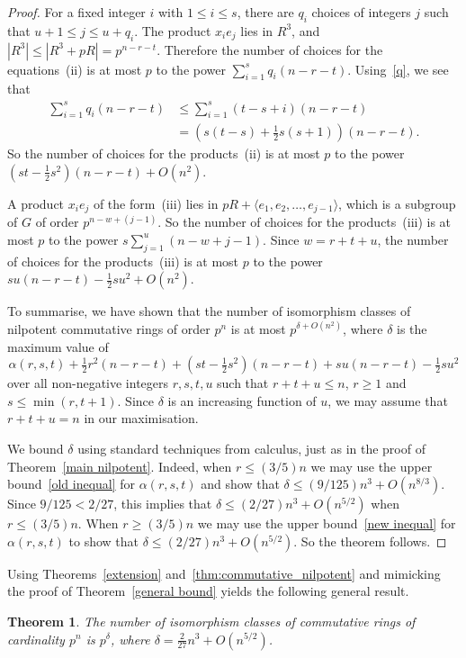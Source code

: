 \documentclass[12pt]{article}
\newtheorem{Thm}{Theorem}[section]
\begin{document}
\begin{proof}
For a fixed integer $i$ with $1\leq i\leq s$, there are $q_i$ choices of integers $j$ such that $u+1\leq j\leq u+q_i$. The product $x_ie_j$ lies in $R^3$, and $|R^3|\leq |R^3+pR|=p^{n-r-t}$. Therefore the number of choices for the equations~(ii) is at most $p$ to the power $\sum_{i=1}^sq_i(n-r-t)$. Using~\eqref{q}, we see that
\begin{align*}
\sum_{i=1}^sq_i(n-r-t)&\leq \sum_{i=1}^s(t-s+i)(n-r-t)\\
&=\left(s(t-s)+\tfrac{1}{2}s(s+1)\right)(n-r-t).
\end{align*}
So the number of choices for the products~(ii) is at most $p$ to the power $(st-\tfrac{1}{2}s^2)(n-r-t)+O(n^2)$.

A product $x_ie_j$ of the form~(iii) lies in $pR+\langle{e_1,e_2,\ldots,e_{j-1}}\rangle$, which is a subgroup of $G$ of order $p^{n-w+(j-1)}$. So the number of choices for the products~(iii) is at most $p$ to the power $s\sum_{j=1}^u(n-w+j-1)$. Since $w=r+t+u$, the number of choices for the products~(iii) is at most $p$ to the power $su(n-r-t)-\frac{1}{2}su^2+O(n^2)$.

To summarise, we have shown that the number of isomorphism classes of nilpotent commutative rings of order $p^n$ is at most $p^{\delta+O(n^2)}$, where $\delta$ is the maximum value of
\[
\alpha(r,s,t)+\tfrac{1}{2}r^2(n-r-t)+(st-\tfrac{1}{2}s^2)(n-r-t)+su(n-r-t)-\tfrac{1}{2}su^2
\]
over all non-negative integers $r,s,t,u$ such that $r+t+u\leq n$, $r\geq 1$ and $s\leq\min(r,t+1)$. Since $\delta$ is an increasing function of $u$, we may assume that $r+t+u=n$ in our maximisation.

We bound $\delta$ using standard techniques from calculus, just as in the proof of Theorem~\ref{main nilpotent}. Indeed, when $r\leq (3/5)n$ we may use the upper bound~\eqref{old inequal} for $\alpha(r,s,t)$ and show that $\delta\leq (9/125)n^3+O(n^{8/3})$. Since $9/125<2/27$, this implies that $\delta\leq (2/27)n^3+O(n^{5/2})$ when $r\leq (3/5)n$. When $r\geq (3/5)n$ we may use the upper bound~\eqref{new inequal} for $\alpha(r,s,t)$ to show that $\delta\leq (2/27)n^3+O(n^{5/2})$. So the theorem follows.
\end{proof}

Using Theorems~\ref{extension} and~\ref{thm:commutative_nilpotent} and mimicking the proof of Theorem~\ref{general bound} yields the following general result.

\begin{Thm}
\label{commutative main}
The number of isomorphism classes of commutative rings of cardinality $p^{n}$ is $p^{\delta}$, where $\delta = \frac{2}{27}n^{3} + O(n^{5/2})$.
\end{Thm}
\end{document}
